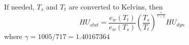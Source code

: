 If needed, $T_s$ and $T_t$ are converted to Kelvins, then
\[
HU_{stat} = 
\frac{e_w(T_t)}{e_w(T_s)}
\left(\frac{T_s}{T_t}\right)^{\frac{\gamma}{\gamma-1}}
HU_{dyn}
\]
where $\gamma =  1005/717 = 1.40167364$
